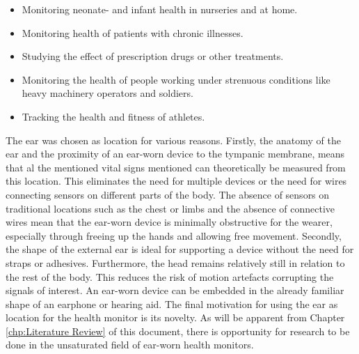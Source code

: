 \begin{itemize}
\item Monitoring neonate- and infant health in nurseries and at home.
\item Monitoring health of patients with chronic illnesses.
\item Studying the effect of prescription drugs or other treatments.
\item Monitoring the health of people working under strenuous conditions like heavy machinery operators and soldiers.
\item Tracking the health and fitness of athletes.
\end{itemize}

The ear was chosen as location for various reasons. Firstly, the anatomy of the ear and the proximity of an ear-worn device to the tympanic membrane, means that al the mentioned vital signs mentioned can theoretically be measured from this location. This eliminates the need for multiple devices or the need for wires connecting sensors on different parts of the body. The absence of sensors on traditional locations such as the chest or limbs and the absence of connective wires mean that the ear-worn device is minimally obstructive for the wearer, especially through freeing up the hands and allowing free movement. Secondly, the shape of the external ear is ideal for supporting a device without the need for straps or adhesives. Furthermore, the head remains relatively still in relation to the rest of the body. This reduces the risk of motion artefacts corrupting the signals of interest. An ear-worn device can be embedded in the already familiar shape of an earphone or hearing aid. The final motivation for using the ear as location for the health monitor is its novelty. As will be apparent from Chapter \ref{chp:Literature Review} of this document, there is opportunity for research to be done in the unsaturated field of ear-worn health monitors.

